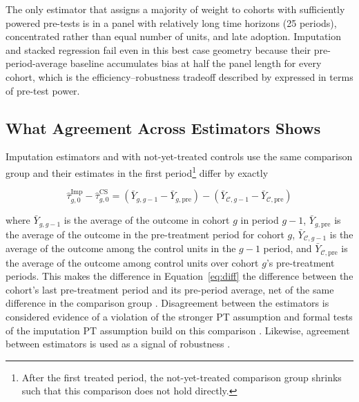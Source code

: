 \documentclass[12pt]{article}
\begin{document}
The only estimator that assigns a majority of weight to cohorts with sufficiently powered pre-tests is \textcite{callaway2021difference} in a panel with relatively long time horizons (25 periods), concentrated rather than equal number of units, and late adoption. Imputation and stacked regression fail even in this best case geometry because their pre-period-average baseline accumulates bias at half the panel length for every cohort, which is the efficiency--robustness tradeoff described by \textcite{roth2023s} expressed in terms of pre-test power.

\subsection{What Agreement Across Estimators Shows} %

Imputation estimators and \textcite{callaway2021difference} with not-yet-treated controls use the same comparison group and their estimates in the first period\footnote{After the first treated period, the not-yet-treated comparison group shrinks such that this comparison does not hold directly.} differ by exactly

\begin{equation}\label{eq:diff}
    \hat{\tau}^{\text{Imp}}_{g,0} -  \hat{\tau}^{\text{CS}}_{g,0} = \left(\bar{Y}_{g,g-1} - \bar{Y}_{g,\text{pre}}\right) - \left(\bar{Y}_{\mathcal{C},g-1} - \bar{Y}_{\mathcal{C}, \text{pre}} \right)
\end{equation}

where $\bar{Y}_{g,g-1}$ is the average of the outcome in cohort $g$ in period $g-1$, $\bar{Y}_{g,\text{pre}}$ is the average of the outcome in the pre-treatment period for cohort $g$, $\bar{Y}_{\mathcal{C},g-1}$ is the average of the outcome among the control units in the $g-1$ period, and $\bar{Y}_{\mathcal{C},\text{pre}}$ is the average of the outcome among control units over cohort $g$'s pre-treatment periods. This makes the difference in Equation~\ref{eq:diff} the difference between the cohort's last pre-treatment period and its pre-period average, net of the same difference in the comparison group \parencite{liu2025cohort}. Disagreement between the estimators is considered evidence of a violation of the stronger PT assumption and formal tests of the imputation PT assumption build on this comparison \parencite{marcus2021role, chen2025efficient}. Likewise, agreement between estimators is used as a signal of robustness \parencite{chiu2026causal}.
\end{document}
